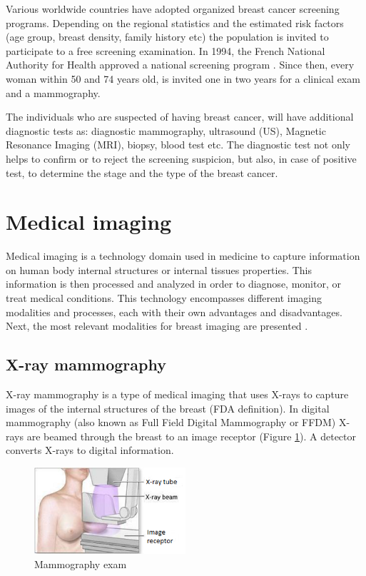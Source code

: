 Various worldwide countries have adopted organized breast cancer screening programs. Depending on the regional statistics and the estimated risk factors (age group, breast density, family history etc) the population is invited to participate to a free screening examination. In 1994, the French National Authority for Health approved a national screening program \citep{HAS_2016}. Since then, every woman within 50 and 74 years old, is invited one in two years for a clinical exam and a mammography.

The individuals who are suspected of having breast cancer, will have additional diagnostic tests as: diagnostic mammography, ultrasound (US), Magnetic Resonance Imaging (MRI), biopsy, blood test etc. The diagnostic test  not only helps to confirm or to reject the screening suspicion, but also, in case of positive test, to determine the stage and the type of the breast cancer.
\section{Medical imaging}\label{section:medicalimaging}
 
Medical imaging is a technology domain used in medicine to capture information on human body internal structures or internal tissues properties. This information is then processed and analyzed in order to diagnose, monitor, or treat medical conditions. This technology encompasses different imaging modalities and processes, each with their own advantages and disadvantages. Next, the most relevant modalities for breast imaging are presented .

 

\subsection{X-ray mammography}\label{subsection:mammography}

X-ray mammography is a type of medical imaging that uses X-rays to capture images of the internal structures of the breast (FDA  definition). In digital mammography (also known as Full Field Digital Mammography or FFDM) X-rays are beamed through the breast to an image receptor (Figure \ref{fig:mammographyc ecam}). A detector converts X-rays to digital information. 

	
\begin{figure}[!h]
\centering
\includegraphics[width=0.5\textwidth,keepaspectratio]{figures/xraymammo.PNG} 
\caption[Mammography exam]{Mammography exam}
\label{fig:mammographyc ecam}
\end{figure} 


